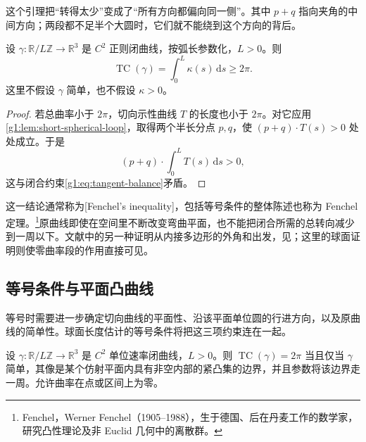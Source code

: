 这个引理把“转得太少”变成了“所有方向都偏向同一侧”。其中 \(p+q\) 指向夹角的中间方向；两段都不足半个大圆时，它们就不能绕到这个方向的背后。

\begin{theorem}\label{g1:thm:fenchel}
	设 \(\gamma:\mathbb R/L\mathbb Z\to\mathbb R^3\) 是 \(C^2\) 正则闭曲线，按弧长参数化，\(L>0\)。则
	\[
		\operatorname{TC}(\gamma)=\int_0^L\kappa(s)\,\mathrm{d}s\ge2\pi.
	\]
	这里不假设 \(\gamma\) 简单，也不假设 \(\kappa>0\)。
\end{theorem}

\begin{proof}
	若总曲率小于 \(2\pi\)，切向示性曲线 \(T\) 的长度也小于 \(2\pi\)。对它应用\cref{g1:lem:short-spherical-loop}，取得两个半长分点 \(p,q\)，使 \((p+q)\cdot T(s)>0\) 处处成立。于是
	\[
		(p+q)\cdot\int_0^L T(s)\,\mathrm{d}s>0,
	\]
	这与闭合约束\eqref{g1:eq:tangent-balance}矛盾。
\end{proof}

这一结论通常称为[Fenchel's inequality]，包括等号条件的整体陈述也称为 Fenchel 定理。\footnote{Fenchel，Werner Fenchel（1905--1988），生于德国、后在丹麦工作的数学家，研究凸性理论及非 Euclid 几何中的离散群。}原曲线即使在空间里不断改变弯曲平面，也不能把闭合所需的总转向减少到一周以下。文献中的另一种证明从内接多边形的外角和出发，见\cite[定理3.4]{Milnor1950}；这里的球面证明则使零曲率段的作用直接可见。

\subsection{等号条件与平面凸曲线}
\label{g1:subsec:0704:03}

等号时需要进一步确定切向曲线的平面性、沿该平面单位圆的行进方向，以及原曲线的简单性。球面长度估计的等号条件将把这三项约束连在一起。

\begin{theorem}\label{g1:thm:fenchel-equality}
	设 \(\gamma:\mathbb R/L\mathbb Z\to\mathbb R^3\) 是 \(C^2\) 单位速率闭曲线，\(L>0\)。则 \(\operatorname{TC}(\gamma)=2\pi\) 当且仅当 \(\gamma\) 简单，其像是某个仿射平面内具有非空内部的紧凸集的边界，并且参数将该边界走一周。允许曲率在点或区间上为零。
\end{theorem}

